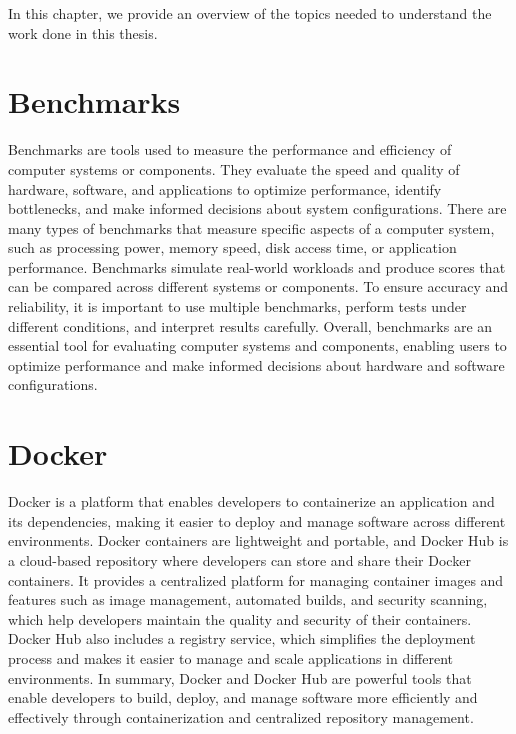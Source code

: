 In this chapter, we provide an overview of the topics needed to understand the work done in this thesis.

\section{Benchmarks}
Benchmarks are tools used to measure the performance and efficiency of computer systems or components.
They evaluate the speed and quality of hardware, software, and applications to optimize performance, identify bottlenecks, and make informed decisions about system configurations.
There are many types of benchmarks that measure specific aspects of a computer system, such as processing power, memory speed, disk access time, or application performance.
Benchmarks simulate real-world workloads and produce scores that can be compared across different systems or components.
To ensure accuracy and reliability, it is important to use multiple benchmarks, perform tests under different conditions, and interpret results carefully.
Overall, benchmarks are an essential tool for evaluating computer systems and components, enabling users to optimize performance and make informed decisions about hardware and software configurations.

\section{Docker}
Docker is a platform that enables developers to containerize an application and its dependencies, making it easier to deploy and manage software across different environments.
Docker containers are lightweight and portable, and Docker Hub is a cloud-based repository where developers can store and share their Docker containers.
It provides a centralized platform for managing container images and features such as image management, automated builds, and security scanning, which help developers maintain the quality and security of their containers.
Docker Hub also includes a registry service, which simplifies the deployment process and makes it easier to manage and scale applications in different environments.
In summary, Docker and Docker Hub are powerful tools that enable developers to build, deploy, and manage software more efficiently and effectively through containerization and centralized repository management.


